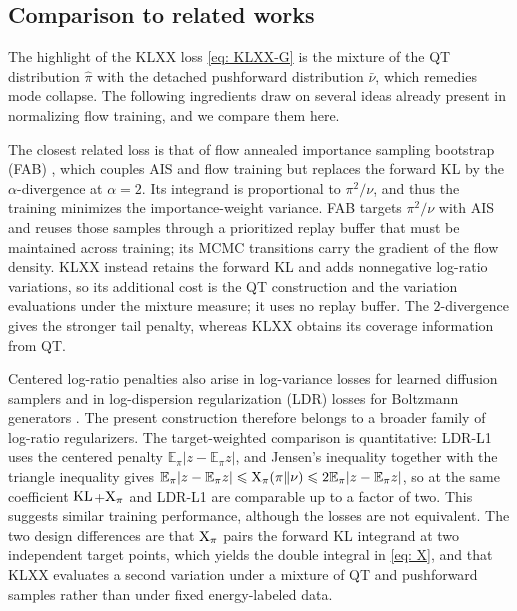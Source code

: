 \documentclass{article}
\begin{document}
\subsection{Comparison to related works}
\label{subsec: loss-related}

The highlight of the KLXX loss \eqref{eq: KLXX-G} is the mixture of the QT distribution $\hat\pi$ with the detached pushforward distribution $\bar\nu$, which remedies mode collapse. The following ingredients draw on several ideas already present in normalizing flow training, and we compare them here.

The closest related loss is that of flow annealed importance sampling bootstrap (FAB) \citep{midgley2022flow}, which couples AIS and flow training but replaces the forward KL by the $\alpha$-divergence at $\alpha=2$. Its integrand is proportional to $\pi^2/\nu$, and thus the training minimizes the importance-weight variance. FAB targets $\pi^2/\nu$ with AIS and reuses those samples through a prioritized replay buffer that must be maintained across training; its MCMC transitions carry the gradient of the flow density. KLXX instead retains the forward KL and adds nonnegative log-ratio variations, so its additional cost is the QT construction and the variation evaluations under the mixture measure; it uses no replay buffer. The $2$-divergence gives the stronger tail penalty, whereas KLXX obtains its coverage information from QT.

Centered log-ratio penalties also arise in log-variance losses for learned diffusion samplers \citep{richter2024improved} and in log-dispersion regularization (LDR) losses for Boltzmann generators \citep{schopmans2026ldr}. The present construction therefore belongs to a broader family of log-ratio regularizers. The target-weighted comparison is quantitative: LDR-L1 uses the centered penalty $\mathbb E_\pi|z-\mathbb E_\pi z|$, and Jensen's inequality together with the triangle inequality gives $\mathbb E_\pi|z-\mathbb E_\pi z|\leqslant\mathrm{X}_\pi(\pi\|\nu)\leqslant2\mathbb E_\pi|z-\mathbb E_\pi z|$, so at the same coefficient $\mathrm{KL}$+$\mathrm{X}_\pi$ and LDR-L1 are comparable up to a factor of two. This suggests similar training performance, although the losses are not equivalent. The two design differences are that $\mathrm{X}_\pi$ pairs the forward KL integrand at two independent target points, which yields the double integral in \eqref{eq: X}, and that KLXX evaluates a second variation under a mixture of QT and pushforward samples rather than under fixed energy-labeled data.
\end{document}
